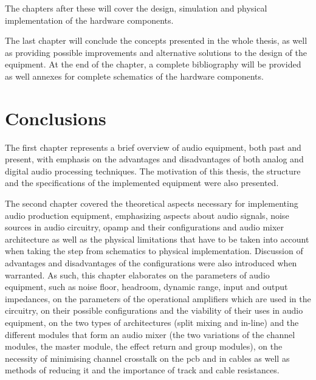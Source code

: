 The chapters after these will cover the design, simulation and physical
implementation of the hardware components.

The last chapter will conclude the concepts presented in the whole thesis, as
well as providing possible improvements and alternative solutions to the design
of the equipment. At the end of the chapter, a complete bibliography will be
provided as well annexes for complete schematics of the hardware components.






\chapter{Conclusions}

The first chapter represents a brief overview of audio equipment, both past and
present, with emphasis on the advantages and disadvantages of both analog and
digital audio processing techniques. The motivation of this thesis, the
structure and the specifications of the implemented equipment were also
presented.

The second chapter covered the theoretical aspects necessary for implementing
audio production equipment, emphasizing aspects about audio signals, noise
sources in audio circuitry, opamp and their configurations and audio mixer
architecture as well as the physical limitations that have to be taken into
account when taking the step from schematics to physical implementation.
Discussion of advantages and disadvantages of the configurations were also
introduced when warranted.
As such, this chapter elaborates on the parameters of audio
equipment, such as noise floor, headroom, dynamic range, input and output
impedances, on the parameters of the operational amplifiers which are used in
the circuitry, on their possible configurations and the viability of their uses
in audio equipment, on the two types of architectures (split mixing and
in-line) and the different modules that form an audio mixer (the two variations
of the channel modules, the master module, the effect return and group
modules), on the necessity of minimising channel crosstalk on the pcb and in
cables as well as methods of reducing it and the importance of track and cable
resistances.

